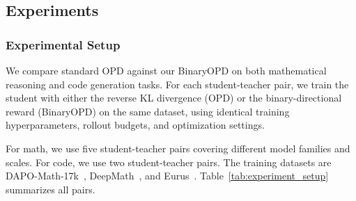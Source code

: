 \documentclass{article}
\theoremstyle{remark}
\begin{document}





\subsection{Experiments}
\label{sec:bdr-experiments}

\subsubsection{Experimental Setup}
\label{sec:bdr-exp-setup}

We compare standard OPD against our BinaryOPD on both mathematical reasoning and code generation tasks. For each student-teacher pair, we train the student with either the reverse KL divergence (OPD) or the binary-directional reward (BinaryOPD) on the same dataset, using identical training hyperparameters, rollout budgets, and optimization settings.

For math, we use five student-teacher pairs covering different model families and scales. For code, we use two student-teacher pairs. The training datasets are DAPO-Math-17k~\citep{yu2026dapo}, DeepMath~\citep{he2026deepmath}, and Eurus~\citep{cui2025process}. Table~\ref{tab:experiment_setup} summarizes all pairs.
\end{document}
